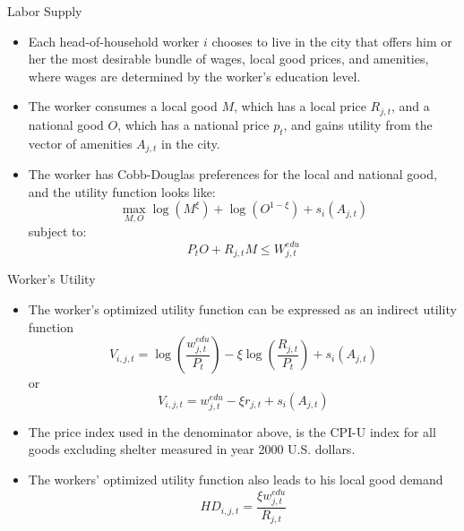 \documentclass[aspectratio=169]{beamer}
\begin{document}
\begin{frame}{Labor Supply}

\begin{itemize}
    \item<1-> Each head-of-household worker $ i $ chooses to live in the city that offers him or her the most desirable bundle of wages, local good prices, and amenities, where wages are determined by the worker's education level.
    \item<2-> The worker consumes a local good $ M $, which has a local price $ R_{j,t} $, and a national good $ O $, which has a national price $ p_{t} $, and gains utility from the vector of amenities $ A_{j,t} $ in the city.
    \item<3-> The worker has Cobb-Douglas preferences for the local and national good, and the utility function looks like:
    \begin{equation*}
        \max_{M,O} \log\left( M^{\xi} \right) + \log\left( O^{1 - \xi} \right) + s_{i}\left( A_{j,t} \right)
    \end{equation*}
    subject to:
    \begin{equation*}
        P_{t} O + R_{j,t} M \le W_{j,t}^{edu}
    \end{equation*}
\end{itemize}
    
\end{frame}


\begin{frame}{Worker's Utility}

\begin{itemize}
    \item<1-> The worker’s optimized utility function can be expressed as an indirect utility function
    \begin{equation*}
        V_{i,j,t} = \log\left( \frac{w_{j,t}^{edu}}{P_{t}} \right) - \xi \log\left( \frac{R_{j,t}}{P_{t}} \right) + s_{i} \left( A_{j,t} \right)
    \end{equation*}
    or
    \begin{equation}
        V_{i,j,t} = w_{j,t}^{edu} - \xi r_{j,t} + s_{i} \left( A_{j,t} \right)
        \label{eq:indirectutility1}
    \end{equation}
    \item<2-> The price index used in the denominator above, is the CPI-U index for all goods excluding shelter measured in year 2000 U.S. dollars.
    \item<3-> The workers’ optimized utility function also leads to his local good demand
    \begin{equation}
        HD_{i,j,t} = \frac{\xi w_{j,t}^{edu}}{R_{j,t}}
        \label{eq:localgooddemand}
    \end{equation}
\end{itemize}
    
\end{frame}
\end{document}
